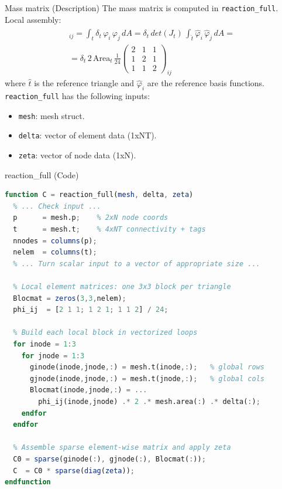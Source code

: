 \documentclass[aspectratio=54,xcolor=dvipsnames]{beamer}
\begin{document}
\begin{frame}{Mass matrix (Description)}
    The mass matrix is computed in \texttt{reaction\_full}. \\
    Local assembly:
    \begin{align*}
        [B^{t}]_{ij}
        = \int_{t} \delta_{t}\,\varphi_i\,\varphi_j \,dA
        = \delta_{t}\,det(J_t)\,\int_{\hat{t}} \hat{\varphi}_i\,\hat{\varphi}_j \,d\hat{A} = \\
        = \delta_{t}\,2\,\mathrm{Area}_{t}\,\frac{1}{24}
          \begin{pmatrix}2&1&1\\1&2&1\\1&1&2\end{pmatrix}_{ij}
    \end{align*}
    where $\hat{t}$ is the reference triangle and $\hat{\varphi}_i$ are the reference basis functions. \\
    \texttt{reaction\_full} has the following inputs:
    \begin{itemize}
        \item \texttt{mesh}: mesh struct.
        \item \texttt{delta}: vector of element data (1xNT).
        \item \texttt{zeta}: vector of node data (1xN).
    \end{itemize}
\end{frame}

\begin{frame}[fragile]{reaction\_full (Code)}
\scriptsize
\begin{lstlisting}[language=Octave,firstnumber=19]
function C = reaction_full(mesh, delta, zeta)
  % ... Check input ...
  p      = mesh.p;    % 2xN node coords
  t      = mesh.t;    % 4xNT connectivity + tags
  nnodes = columns(p);
  nelem  = columns(t);
  % ... Turn scalar input to a vector of appropriate size ...

  % Local element matrices: one 3x3 block per triangle
  Blocmat = zeros(3,3,nelem);
  phi_ij  = [2 1 1; 1 2 1; 1 1 2] / 24;

  % Build each local block in vectorized loops
  for inode = 1:3
    for jnode = 1:3
      ginode(inode,jnode,:) = mesh.t(inode,:);   % global rows
      gjnode(inode,jnode,:) = mesh.t(jnode,:);   % global cols
      Blocmat(inode,jnode,:) = ...
        phi_ij(inode,jnode) .* 2 .* mesh.area(:) .* delta(:);
    endfor
  endfor

  % Assemble sparse element-wise matrix and apply zeta
  C0 = sparse(ginode(:), gjnode(:), Blocmat(:));
  C  = C0 * sparse(diag(zeta));
endfunction
\end{lstlisting}
\end{frame}
\end{document}
